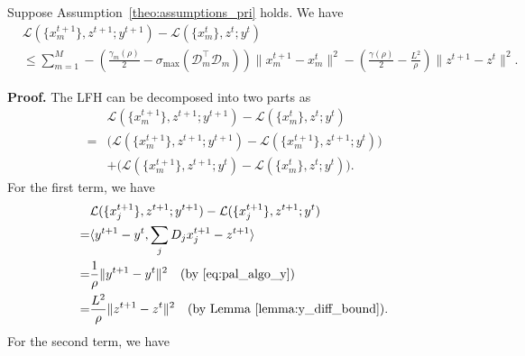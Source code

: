 \begin{lemma}\label{lemma:L_iter_diff}
Suppose Assumption~\ref{theo:assumptions_pri} holds. We have
\begin{align}
    & \mathcal{L}(\{x_m^{t+1}\},z^{t+1};y^{t+1}) - \mathcal{L}(\{x_m^{t}\},z^{t};y^{t})\nonumber\\
    & \le \sum_{m=1}^{M} -\left(\frac{\gamma_m(\rho)}{2}-\sigma_{\text{max}}(\mathcal{D}_m^\top \mathcal{D}_m)\right)\|x_m^{t+1} - x_m^t\|^2 - \left(\frac{\gamma(\rho)}{2} - \frac{L^2}{\rho}\right)\|z^{t+1} - z^t\|^2. \nonumber
\end{align}
\end{lemma}
{\bf Proof.} The LFH can be decomposed into two parts as
\begin{align}
    & \mathcal{L}(\{x_m^{t+1}\},z^{t+1};y^{t+1}) - \mathcal{L}(\{x_m^{t}\},z^{t};y^{t})\nonumber\\
    = & \big(\mathcal{L}(\{x_m^{t+1}\},z^{t+1};y^{t+1}) - \mathcal{L}(\{x_m^{t+1}\},z^{t+1};y^{t})\big)\nonumber\\
    & + \big(\mathcal{L}(\{x_m^{t+1}\},z^{t+1};y^{t}) - \mathcal{L}(\{x_m^{t}\},z^{t};y^{t})\big). \label{eq:proof_diff_L_0_pal}
\end{align}
For the first term, we have
\begin{align}
    & \mathcal{L}(\{x_j^{t+1}\},z^{t+1};y^{t+1}) - \mathcal{L}(\{x_j^{t+1}\},z^{t+1};y^{t})\nonumber\\
    = & \langle y^{t+1} - y^t , \sum_jD_jx_j^{t+1} - z^{t+1}\rangle\nonumber\\
    = & \frac{1}{\rho}\|y^{t+1} - y^t\|^2\quad\text{(by \eqref{eq:pal_algo_y})}\nonumber\\
    = & \frac{L^2}{\rho}\|z^{t+1} - z^t\|^2\quad\text{(by Lemma~\ref{lemma:y_diff_bound})}\label{eq:proof_diff_L_1_pal}.
\end{align}
For the second term, we have
